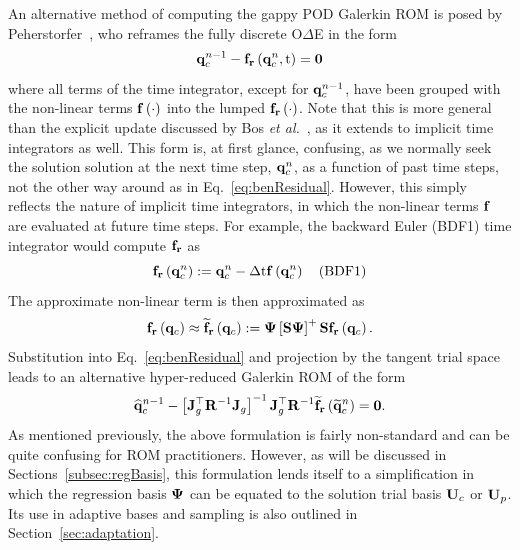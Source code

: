 An alternative method of computing the gappy POD Galerkin ROM is posed by Peherstorfer~\cite{Peherstorfer2020Adaptive}, who reframes the fully discrete O$\Delta$E in the form
%
\begin{equation}\label{eq:benResidual}
	\mathbf{q}_{c}^{n-1} - \mathbf{f}_{\mathbf{r}}\left(\mathbf{q}_{c}^{n}, \text{t}\right) = \mathbf{0}
\end{equation}
%
where all terms of the time integrator, except for $\mathbf{q}_{c}^{n - 1}$, have been grouped with the non-linear terms $\mathbf{f} \left(\cdot\right)$ into the lumped $\mathbf{f}_{\mathbf{r}}\left(\cdot\right)$. Note that this is more general than the explicit update discussed by Bos \textit{et al.}~\cite{Bos2004}, as it extends to implicit time integrators as well. This form is, at first glance, confusing, as we normally seek the solution solution at the next time step, $\mathbf{q}_{c}^{n}$, as a function of past time steps, not the other way around as in Eq.~\ref{eq:benResidual}. However, this simply reflects the nature of implicit time integrators, in which the non-linear terms $\mathbf{f}$ are evaluated at future time steps. For example, the backward Euler (BDF1) time integrator would compute $\mathbf{f}_{\mathbf{r}}$ as
%
\begin{equation}
	\mathbf{f}_{\mathbf{r}}\left(\mathbf{q}_{c}^{n}\right) := \mathbf{q}_{c}^{n} - \Delta \text{t} \mathbf{f} \left(\mathbf{q}_{c}^{n}\right) \quad \text{(BDF1)}
\end{equation}
%
The approximate non-linear term is then approximated as
%
\begin{equation}
	\rhsResFunc{\consVec} \approx \rhsResApproxFunc{\consVec} \defEq \deimBasis \left[\sampMat \deimBasis \right]^+ \sampMat \rhsResFunc{\consVec}.
\end{equation}
%
Substitution into Eq.~\ref{eq:benResidual} and projection by the tangent trial space leads to an alternative hyper-reduced Galerkin ROM of the form
%
\begin{equation}
    \consVecCoef^{\timeIdx-1} - \left[\jacobDecode^\top \resScaleInv \jacobDecode\right]^{-1} \jacobDecode^\top \resScaleInv \rhsResApproxFunc{\consVecRom^{\timeIdx}} = \zeroVec.
\end{equation}
%
As mentioned previously, the above formulation is fairly non-standard and can be quite confusing for ROM practitioners. However, as will be discussed in Sections~\ref{subsec:regBasis}, this formulation lends itself to a simplification in which the regression basis $\deimBasis$ can be equated to the solution trial basis $\consTrial$ or $\primTrial$. Its use in adaptive bases and sampling is also outlined in Section~\ref{sec:adaptation}.

